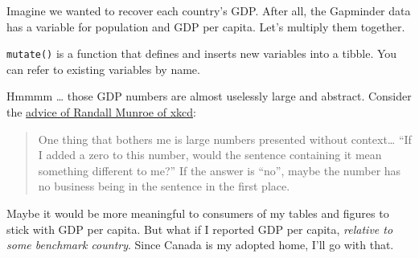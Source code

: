 \documentclass[
]{book}
\newenvironment{Shaded}{\begin{snugshade}}{\end{snugshade}}
\newcommand{\CommentTok}[1]{\textcolor[rgb]{0.56,0.35,0.01}{\textit{#1}}}
\newcommand{\DataTypeTok}[1]{\textcolor[rgb]{0.13,0.29,0.53}{#1}}
\newcommand{\KeywordTok}[1]{\textcolor[rgb]{0.13,0.29,0.53}{\textbf{#1}}}
\newcommand{\NormalTok}[1]{#1}
\newcommand{\OperatorTok}[1]{\textcolor[rgb]{0.81,0.36,0.00}{\textbf{#1}}}
\newcommand{\StringTok}[1]{\textcolor[rgb]{0.31,0.60,0.02}{#1}}
\begin{document}
Imagine we wanted to recover each country's GDP. After all, the Gapminder data has a variable for population and GDP per capita. Let's multiply them together.

\texttt{mutate()} is a function that defines and inserts new variables into a tibble. You can refer to existing variables by name.

\begin{Shaded}
\end{Shaded}

Hmmmm \ldots{} those GDP numbers are almost uselessly large and abstract. Consider the \href{https://fivethirtyeight.com/features/xkcd-randall-munroe-qanda-what-if/}{advice of Randall Munroe of xkcd}:

\begin{quote}
One thing that bothers me is large numbers presented without context\ldots{} ``If I added a zero to this number, would the sentence containing it mean something different to me?'' If the answer is ``no'', maybe the number has no business being in the sentence in the first place.
\end{quote}

Maybe it would be more meaningful to consumers of my tables and figures to stick with GDP per capita. But what if I reported GDP per capita, \emph{relative to some benchmark country}. Since Canada is my adopted home, I'll go with that.
\end{document}
